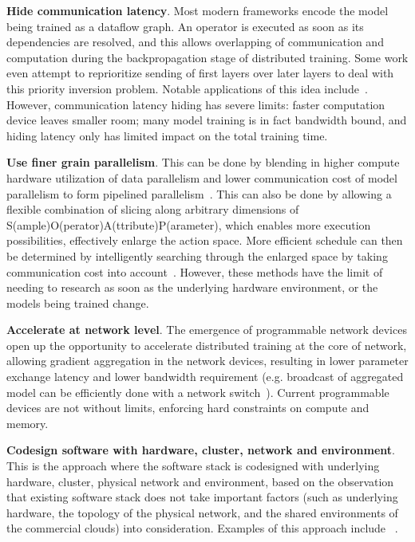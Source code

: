 \noindent\textbf{Hide communication latency}. Most modern frameworks encode the model being trained as a dataflow graph. An operator is executed as soon as its dependencies are resolved, and this allows overlapping of communication and computation during the backpropagation stage of distributed training. Some work even attempt to reprioritize sending of first layers over later layers to deal with this priority inversion problem. Notable applications of this idea include~\cite{hashemi2018tictac, prioritybased, poseidon, 10.1145/3341301.3359642}. However, communication latency hiding has severe limits: faster computation device leaves smaller room; many model training is in fact bandwidth bound, and hiding latency only has limited impact on the total training time.

\noindent\textbf{Use finer grain parallelism}. This can be done by blending in higher compute hardware utilization of data parallelism and lower communication cost of model parallelism to form pipelined parallelism~\cite{harlap2018pipedream}. This can also be done by allowing a flexible combination of slicing along arbitrary dimensions of S(ample)O(perator)A(ttribute)P(arameter), which enables more execution possibilities, effectively enlarge the action space. More efficient schedule can then be determined by intelligently searching through the enlarged space by taking communication cost into account~\cite{jia2018beyond}. However, these methods have the limit of needing to research as soon as the underlying hardware environment, or the models being trained change.

\noindent\textbf{Accelerate at network level}. The emergence of programmable network devices open up the opportunity to accelerate distributed training at the core of network, allowing gradient aggregation in the network devices, resulting in lower parameter exchange latency and lower bandwidth requirement (e.g. broadcast of aggregated model can be efficiently done with a network switch~\cite{sapio2019scaling,luomotivating}). Current programmable devices are not without limits, enforcing hard constraints on compute and memory.

\noindent\textbf{Codesign software with hardware, cluster, network and environment}. This is the approach where the software stack is codesigned with underlying hardware, cluster, physical network and environment, based on the observation that existing software stack does not take important factors (such as underlying hardware, the topology of the physical network, and the shared environments of the commercial clouds) into consideration. Examples of this approach include \plink{}~\cite{phubsocc, phubsysml}.

